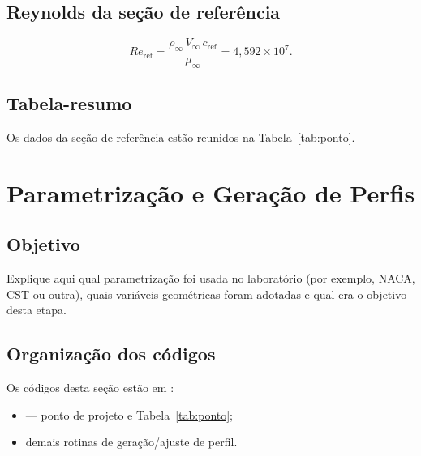 \subsection{Reynolds da seção de referência}

\begin{equation}
Re_{\mathrm{ref}}
= \frac{\rho_{\infty}\,V_{\infty}\,c_{\mathrm{ref}}}{\mu_{\infty}}
= 4{,}592\times 10^{7}.
\end{equation}

\subsection{Tabela-resumo}

Os dados da seção de referência estão reunidos na Tabela~\ref{tab:ponto}.

\begin{table}[H]
\centering
\caption{Dados para a seção de referência.}
\label{tab:ponto}
\small

\end{table}

\section{Parametrização e Geração de Perfis}
\label{sec:airfoil-mod}

\subsection{Objetivo}

Explique aqui qual parametrização foi usada no laboratório
(por exemplo, NACA, CST ou outra), quais variáveis geométricas foram
adotadas e qual era o objetivo desta etapa.

\subsection{Organização dos códigos}

Os códigos desta seção estão em
:
\begin{itemize}
\item {} --- ponto de projeto e Tabela~\ref{tab:ponto};
\item demais rotinas de geração/ajuste de perfil.
\end{itemize}

